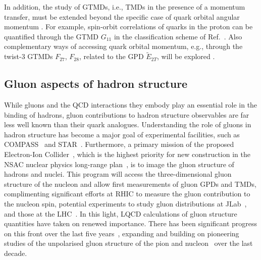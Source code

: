 In addition, the study of GTMDs, i.e., TMDs in the presence of a
momentum transfer, must be extended beyond the specific case of quark
orbital angular momentum \cite{Engelhardt:2017miy}. For example, spin-orbit correlations of quarks
in the proton can be quantified through the GTMD $G_{11} $ in the
classification scheme of Ref.~\cite{Meissner:2009ww}.
Also complementary ways of accessing quark orbital
momentum, e.g., through the twist-3 GTMDs $F_{27} $, $F_{28} $, related
to the GPD $\widetilde{E}_{2T} $, will be explored  \cite{Meissner:2009ww}.











\subsection{Gluon aspects of hadron structure}

%



While gluons and the QCD interactions they embody play an essential role in the binding of hadrons, gluon contributions to hadron structure observables are far less well known than their quark analogues. Understanding the role of gluons in hadron structure has become a major goal of experimental facilities, such as COMPASS~\cite{Adare:2014hsq} and STAR~\cite{Djawotho:2013pga}. Furthermore, a primary mission of the proposed Electron-Ion Collider~\cite{Accardi:2012qut,Kalantarians:2014eda}, which is the highest priority for new construction in the NSAC nuclear physics long-range plan~\cite{Geesaman:2015fha}, is to image the gluon structure of hadrons and nuclei. This program will access the three-dimensional gluon structure of the nucleon and allow first measurements of gluon GPDs and TMDs, complimenting significant efforts at RHIC to measure the gluon contribution to the nucleon spin,  potential experiments to study gluon distributions at JLab~\cite{Maxwell:2018gci,Hattawy:2017woc,Dobbs:2017vjw}, and those at the LHC~\cite{Baltz:2007kq}. 
%
In this light, LQCD calculations of gluon structure quantities have taken on renewed importance. There has been significant progress on this front over the last five years~\cite{Alexandrou:2017oeh,Yang:2016plb,Detmold:2016gpy,Detmold:2017oqb,Winter:2017bfs,Alexandrou:2016ekb}, expanding and building on pioneering studies of the unpolarised gluon structure of the pion and nucleon~\cite{Meyer:2007tm,Horsley:2012pz,Alexandrou:2013tfa,Deka:2013zha} over the last decade. 

